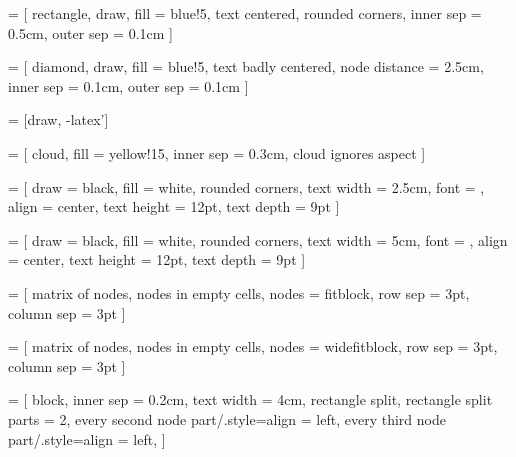 
\setcounter{secnumdepth}{2}


\newenvironment{ctable}[2] {
\begin{table}[htbp]
  \caption{#1}
  \begin{center}
    \begin{tabular}{#2}
}
{
    \end{tabular}
  \end{center}
\end{table}
}


\usepackage{tikz}
\usepackage{pgfplots}
\usepackage{pgfplotstable}
\usepackage{tikzscale}
\usetikzlibrary{shapes, arrows, calc, positioning, fit, matrix, er}

 = [
    rectangle,
    draw,
    fill = blue!5,
    text centered,
    rounded corners,
    inner sep = 0.5cm,
    outer sep = 0.1cm
]

 = [
    diamond,
    draw,
    fill = blue!5,
    text badly centered,
    node distance = 2.5cm,
    inner sep = 0.1cm,
    outer sep = 0.1cm
]

 = [draw, -latex']

 = [
    cloud,
    fill = yellow!15,
    inner sep = 0.3cm,
    cloud ignores aspect
]

 = [
    draw = black,
    fill = white,
    rounded corners,
    text width = 2.5cm,
    font = {\sffamily\bfseries\color{black}},
    align = center,
    text height = 12pt,
    text depth = 9pt
]

 = [
    draw = black,
    fill = white,
    rounded corners,
    text width = 5cm,
    font = {\sffamily\bfseries\color{black}},
    align = center,
    text height = 12pt,
    text depth = 9pt
]

 = [
    matrix of nodes,
    nodes in empty cells,
    nodes = {fitblock},
    row sep = 3pt,
    column sep = 3pt
]

 = [
    matrix of nodes,
    nodes in empty cells,
    nodes = {widefitblock},
    row sep = 3pt,
    column sep = 3pt
]

 = [
    block,
    inner sep = 0.2cm,
    text width = 4cm,
    rectangle split,
    rectangle split parts = 2,
    every second node part/.style={align = left},
    every third node part/.style={align = left},
]

